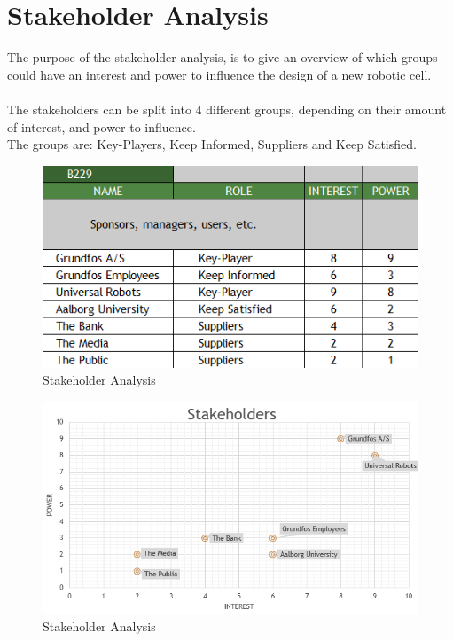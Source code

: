 \chapter{Stakeholder Analysis} \label{ch:Stakeholder Analysis}

The purpose of the stakeholder analysis, is to give an overview of which groups could have an interest and power to influence the design of a new robotic cell.\\
\\
The stakeholders can be split into 4 different groups, depending on their amount of interest, and power to influence.\\
The groups are: Key-Players, Keep Informed, Suppliers and Keep Satisfied.\\

\begin{figure}[h]
    \centering
    \includegraphics[scale=0.65]{StakeholderAnalysis/Stake-Ranking.PNG}
    \caption{Stakeholder Analysis} 
    \label{fig:Stakeholder-ranking} 
\end{figure}
\newpage
\begin{figure}[h]
    \centering
    \includegraphics[scale=0.65]{StakeholderAnalysis/Stake-Graph.PNG}
    \caption{Stakeholder Analysis} 
    \label{fig:Stakeholder-graph} 
\end{figure}

